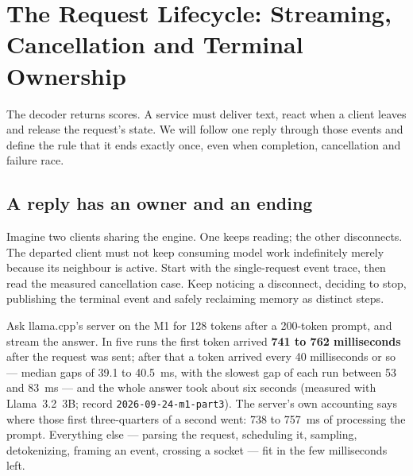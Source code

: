 \chapter{The Request Lifecycle: Streaming, Cancellation and Terminal Ownership}\label{ch:request-lifecycle}\label{chapter-1-the-missing-half-of-ai}

\begin{ChapterIntent}
The decoder returns scores. A service must deliver text, react when a client leaves and
release the request's state. We will follow one reply through those events and define
the rule that it ends exactly once, even when completion, cancellation and failure race.
\end{ChapterIntent}

\section*{A reply has an owner and an ending}
Imagine two clients sharing the engine. One keeps reading; the other disconnects. The
departed client must not keep consuming model work indefinitely merely because its
neighbour is active. Start with the single-request event trace, then read the measured
cancellation case. Keep noticing a disconnect, deciding to stop, publishing the terminal
event and safely reclaiming memory as distinct steps.


Ask llama.cpp's server on the M1 for 128 tokens after a 200-token prompt, and
stream the answer. In five runs the first token arrived \textbf{741 to 762
milliseconds} after the request was sent; after that a token arrived every 40
milliseconds or so --- median gaps of 39.1 to 40.5~ms, with the slowest gap of
each run between 53 and 83~ms --- and the whole answer took about six seconds
(measured with Llama~3.2~3B; record \texttt{2026-09-24-m1-part3}). The server's
own accounting says where those first three-quarters of a second went: 738 to
757~ms of processing the prompt. Everything else --- parsing the request, scheduling it, sampling,
detokenizing, framing an event, crossing a socket --- fit in the few
milliseconds left.

